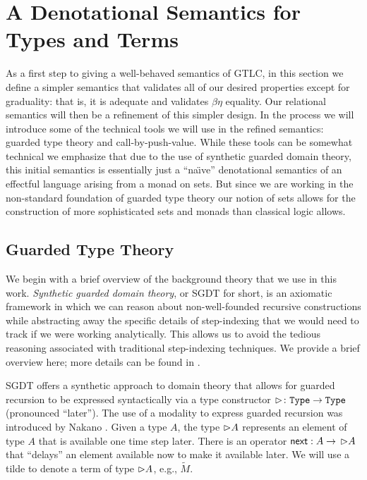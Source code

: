 \section{A Denotational Semantics for Types and Terms}\label{sec:concrete-term-model}

As a first step to giving a well-behaved semantics of GTLC, in this
section we define a simpler semantics that validates all of our
desired properties except for graduality: that is, it is adequate and
validates $\beta\eta$ equality. Our relational semantics will then be
a refinement of this simpler design. In the process we will introduce
some of the technical tools we will use in the refined semantics:
guarded type theory and call-by-push-value. While these tools can be
somewhat technical we emphasize that due to the use of synthetic
guarded domain theory, this initial semantics is essentially just a
``na\"\i ve'' denotational semantics of an effectful language arising
from a monad on sets. But since we are working in the non-standard
foundation of guarded type theory our notion of sets allows for the
construction of more sophisticated sets and monads than classical
logic allows.

%

\subsection{Guarded Type Theory}\label{sec:guarded-type-theory}

We begin with a brief overview of the background theory that we use in this work.
\emph{Synthetic guarded domain theory}, or SGDT for
short, is an axiomatic framework in which we can reason about non-well-founded
recursive constructions while abstracting away the specific details of
step-indexing that we would need to track if we were working analytically. This
allows us to avoid the tedious reasoning associated with traditional
step-indexing techniques. We provide a brief overview here; more details can be
found in \cite{birkedal-mogelberg-schwinghammer-stovring2011}.

SGDT offers a synthetic approach to domain theory that allows for guarded
recursion to be expressed syntactically via a type constructor ${\vartriangleright} \colon
\texttt{Type} \to \texttt{Type}$ (pronounced ``later''). The use of a modality to express
guarded recursion was introduced by Nakano \cite{Nakano2000}.
%
Given a type $A$, the type ${\vartriangleright} A$ represents an element of type $A$ that is
available one time step later. There is an operator $\mathsf{next} : A \to\, {\vartriangleright} A$
that ``delays'' an element available now to make it available later. We will use
a tilde to denote a term of type ${\vartriangleright} A$, e.g., $\tilde{M}$.

